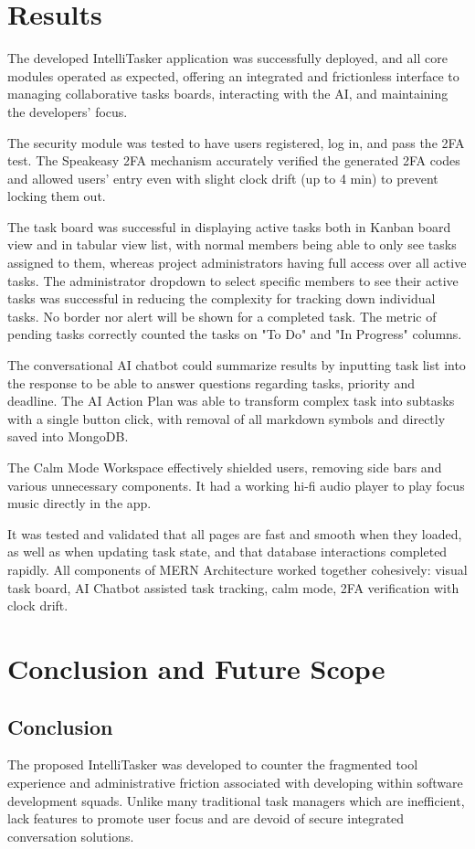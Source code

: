 \documentclass[conference]{IEEEtran}
\begin{document}
\section{Results}
The developed IntelliTasker application was successfully deployed, and all core modules operated as expected, offering an integrated and frictionless interface to managing collaborative tasks boards, interacting with the AI, and maintaining the developers' focus.

The security module was tested to have users registered, log in, and pass the 2FA test. The Speakeasy 2FA mechanism accurately verified the generated 2FA codes and allowed users' entry even with slight clock drift (up to 4 min) to prevent locking them out.

The task board was successful in displaying active tasks both in Kanban board view and in tabular view list, with normal members being able to only see tasks assigned to them, whereas project administrators having full access over all active tasks. The administrator dropdown to select specific members to see their active tasks was successful in reducing the complexity for tracking down individual tasks. No border nor alert will be shown for a completed task. The metric of pending tasks correctly counted the tasks on "To Do" and "In Progress" columns.

The conversational AI chatbot could summarize results by inputting task list into the response to be able to answer questions regarding tasks, priority and deadline. The AI Action Plan was able to transform complex task into subtasks with a single button click, with removal of all markdown symbols and directly saved into MongoDB.

The Calm Mode Workspace effectively shielded users, removing side bars and various unnecessary components. It had a working hi-fi audio player to play focus music directly in the app.

It was tested and validated that all pages are fast and smooth when they loaded, as well as when updating task state, and that database interactions completed rapidly. All components of MERN Architecture worked together cohesively: visual task board, AI Chatbot assisted task tracking, calm mode, 2FA verification with clock drift.

\section{Conclusion and Future Scope}

\subsection{Conclusion}
The proposed IntelliTasker was developed to counter the fragmented tool experience and administrative friction associated with developing within software development squads. Unlike many traditional task managers which are inefficient, lack features to promote user focus and are devoid of secure integrated conversation solutions.
\end{document}
